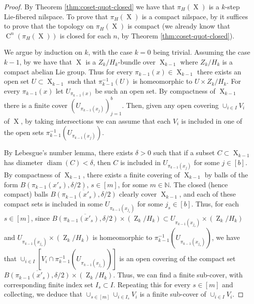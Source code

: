 \documentclass[a4paper,12pt,reqno]{amsart}
\theoremstyle{definition}
\newcommand{\mb}{\mathbb}
\DeclareMathOperator{\ab}{Z}
\DeclareMathOperator{\ns}{X}
\DeclareMathOperator{\cu}{C}
\DeclareMathOperator{\diam}{diam}
\begin{document}
\begin{proof}
By Theorem \ref{thm:coset-quot-closed} we have that $\pi_H(\ns)$ is a $k$-step Lie-fibered nilspace. To prove that $\pi_H(\ns)$ is a compact nilspace, by \cite[Definition 1.0.2]{Cand:Notes2} it suffices to prove that the topology on $\pi_H(\ns)$ is compact (we already know that $\cu^n(\pi_H(\ns))$ is closed for each $n$, by Theorem \ref{thm:coset-quot-closed}).

We argue by induction on $k$, with the case $k=0$ being trivial. Assuming the case $k-1$, by \cite[Theorem 3.3]{Gleason} we have that $\ns$ is a $Z_k/H_k$-bundle over $\ns_{k-1}$ where $Z_k/H_k$ is a compact abelian Lie group. Thus for every $\pi_{k-1}(x)\in \ns_{k-1}$ there exists an open set $U\subset \ns_{k-1} $ such that $\pi_{k-1}^{-1}(U)$ is homeomorphic to $U\times Z_k/H_k$. For every $\pi_{k-1}(x)$ let $U_{\pi_{k-1}(x)}$ be such an open set. By compactness of $\ns_{k-1}$ there is a finite cover $(U_{\pi_{k-1}(x_j)})_{j=1}^b$. Then, given any open covering $\cup_{i\in I} V_i$ of $\ns$, by taking intersections we can assume that each $V_i$ is included in one of the open sets $\pi_{k-1}^{-1}(U_{\pi_{k-1}(x_j)})$.

By Lebesgue's number lemma, there exists $\delta>0$ such that if a subset $C\subset \ns_{k-1}$ has diameter $\diam(C)<\delta$, then $C$ is included in $U_{\pi_{k-1}(x_j)}$ for some $j\in [b]$. By compactness of $\ns_{k-1}$, there exists a finite covering of $\ns_{k-1}$ by balls of the form $B(\pi_{k-1}(x'_s),\delta/2)$, $s\in [m]$, for some $m\in \mb{N}$. The closed (hence compact)  balls $\overline{B(\pi_{k-1}(x'_s),\delta/2)}$ clearly cover $\ns_{k-1}$, and each of these compact sets is included in some $U_{\pi_{k-1}(x_{j_s})}$ for some $j_s\in[b]$. Thus, for each $s\in[m]$, since $\overline{B(\pi_{k-1}(x'_s),\delta/2)}\times (\ab_k/H_k)\subset U_{\pi_{k-1}(x_{j_s})}\times (\ab_k/H_k)$ and $U_{\pi_{k-1}(x_{j_s})}\times (\ab_k/H_k)$ is homeomorphic to $\pi_{k-1}^{-1}(U_{\pi_{k-1}(x_{j_s})})$, we have that $\cup_{i\in I} [V_i\cap \pi_{k-1}^{-1}(U_{\pi_{k-1}(x_{j_s})})]$ is an open covering of the compact set $\overline{B(\pi_{k-1}(x'_s),\delta/2)}\times (\ab_k/H_k)$. Thus, we can find a finite sub-cover, with corresponding finite index set $I_s\subset I$. Repeating this for every $s\in [m]$ and collecting, we deduce that $\cup_{s\in[m]}\cup_{i\in I_s} V_i$ is a finite sub-cover of $\cup_{i\in I} V_i$.
\end{proof}
\end{document}
